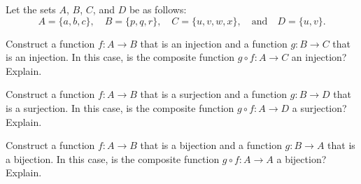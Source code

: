 \begin{activity} \label{act:composition2}
Let the sets $A$, $B$, $C$, and $D$ be as follows:
\[A = \{ a, b, c \}, \quad B = \{p, q, r\}, \quad C = \{u, v, w, x \}, \quad \text{and} \quad D = \{u, v \}.\]
\ba
  \item Construct a function $f : A \to B$ that is an injection and a function $g : B \to C$ that is an injection.  In this case, is the composite function $g \circ f : A \to C$ an injection?  Explain.

    \item Construct a function $f : A \to B$ that is a surjection and a function $g : B \to D$ that is a surjection.  In this case, is the composite function $g \circ f : A \to D$ a surjection?  Explain.

  \item Construct a function $f : A \to B$ that is a bijection and a function $g : B \to A$ that is a bijection.  In this case, is the composite function $g \circ f : A \to A$ a bijection?  Explain.

\ea
\end{activity}

\begin{comment}

\ActivitySolution

\ba
  \item Define $f$ and $g$ by 
  \[f(a) = p, \ f(b) = q, \ f(c) = r  \ \text{ and } \ g(p) = u, \ g(q) = v,  \ g(r) = w.\]
  So both $f$ and $g$ are injections. Notice that 
  \[(g \circ f)(a) = u, \ (g \circ f)(b) = v, \ \text{ and } \ (g \circ f)(c) = w,\]
  so $g \circ f : A \to C$ is also an injection.

    \item Define $f$ and $g$ by 
  \[f(a) = p, \ f(b) = q, \ f(c) = r  \ \text{ and } \ g(p) = u, \ g(q) = v,  \ g(r) = u.\]
  So both $f$ and $g$ are surjections. Notice that 
  \[(g \circ f)(a) = u, \ (g \circ f)(b) = v, \ \text{ and } \ (g \circ f)(c) = u,\]
  so $g \circ f : A \to D$ is also a surjection.

  \item Define $f$ and $g$ by 
  \[f(a) = p, \ f(b) = q, \ f(c) = r  \ \text{ and } \ g(p) = c, \ g(q) = b,  \ g(r) = a.\]
  So both $f$ and $g$ are bijections. Notice that 
  \[(g \circ f)(a) = c, \ (g \circ f)(b) = b, \ \text{ and } \ (g \circ f)(c) = a,\]
  so $g \circ f : A \to A$ is also a bijection.

\ea

\end{comment}

